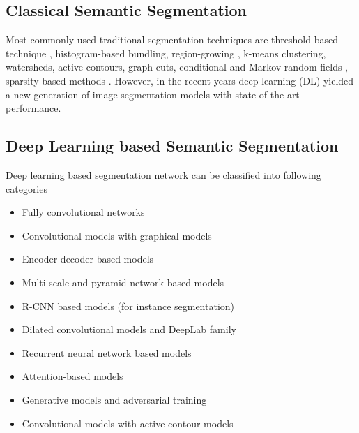     \subsection{Classical Semantic Segmentation}
    
    Most commonly used traditional segmentation techniques are threshold based technique \cite{56_otsu1979threshold}, histogram-based bundling, region-growing \cite{57_otsu1979threshold}, k-means clustering, watersheds, active contours, graph cuts, conditional and Markov random fields \cite{58_boykov2001fast}, sparsity based methods \cite{59_starck2005image}. However, in the recent years deep learning (DL) yielded a new generation of image segmentation models with state of the art performance. 
    
    \subsection{Deep Learning based  Semantic Segmentation}
    
    Deep learning based segmentation network can be classified into following categories \cite{60_minaee2021image}
    
    \begin{itemize}
    	\item Fully convolutional networks
    	\item Convolutional models with graphical models
    	\item Encoder-decoder based models
    	\item Multi-scale and pyramid network based models
    	\item R-CNN based models (for instance segmentation)
    	\item Dilated convolutional models and DeepLab family
    	\item Recurrent neural network based models
    	\item Attention-based models
    	\item Generative models and adversarial training
    	\item Convolutional models with active contour models
    \end{itemize}
    
